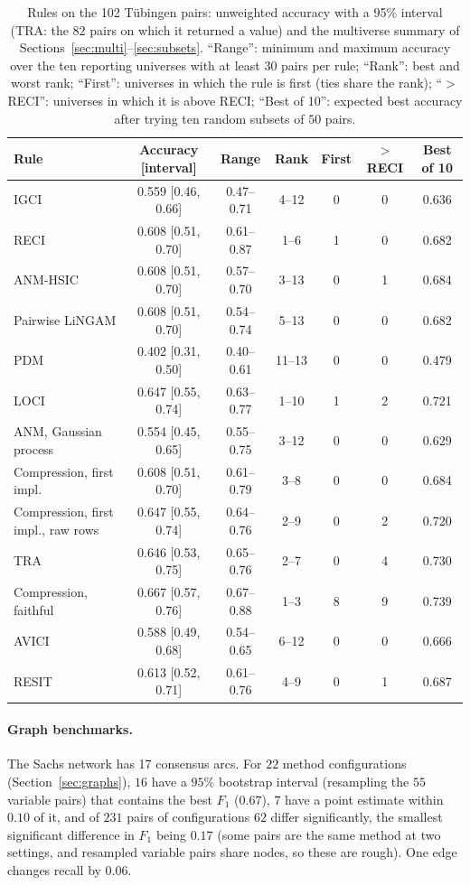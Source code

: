 \begin{table}[t]
\caption{Rules on the 102 T\"ubingen pairs: unweighted accuracy with a 95\% interval (TRA: the $82$ pairs on which it returned a value) and the multiverse summary of Sections~\ref{sec:multi}--\ref{sec:subsets}. ``Range'': minimum and maximum accuracy over the ten reporting universes with at least $30$ pairs per rule; ``Rank'': best and worst rank; ``First'': universes in which the rule is first (ties share the rank); ``$>$RECI'': universes in which it is above RECI; ``Best of 10'': expected best accuracy after trying ten random subsets of $50$ pairs.}
\label{tab:multi}
\small
\setlength{\tabcolsep}{3pt}
\begin{tabular}{@{}lcccccc@{}}
\toprule
Rule & Accuracy [interval] & Range & Rank & First & $>$RECI & Best of 10\\
\midrule
IGCI & 0.559 [0.46, 0.66] & 0.47--0.71 & 4--12 & 0 & 0 & 0.636\\
RECI & 0.608 [0.51, 0.70] & 0.61--0.87 & 1--6 & 1 & 0 & 0.682\\
ANM-HSIC & 0.608 [0.51, 0.70] & 0.57--0.70 & 3--13 & 0 & 1 & 0.684\\
Pairwise LiNGAM & 0.608 [0.51, 0.70] & 0.54--0.74 & 5--13 & 0 & 0 & 0.682\\
PDM & 0.402 [0.31, 0.50] & 0.40--0.61 & 11--13 & 0 & 0 & 0.479\\
LOCI & 0.647 [0.55, 0.74] & 0.63--0.77 & 1--10 & 1 & 2 & 0.721\\
ANM, Gaussian process & 0.554 [0.45, 0.65] & 0.55--0.75 & 3--12 & 0 & 0 & 0.629\\
Compression, first impl. & 0.608 [0.51, 0.70] & 0.61--0.79 & 3--8 & 0 & 0 & 0.684\\
Compression, first impl., raw rows & 0.647 [0.55, 0.74] & 0.64--0.76 & 2--9 & 0 & 2 & 0.720\\
TRA & 0.646 [0.53, 0.75] & 0.65--0.76 & 2--7 & 0 & 4 & 0.730\\
Compression, faithful & 0.667 [0.57, 0.76] & 0.67--0.88 & 1--3 & 8 & 9 & 0.739\\
AVICI & 0.588 [0.49, 0.68] & 0.54--0.65 & 6--12 & 0 & 0 & 0.666\\
RESIT & 0.613 [0.52, 0.71] & 0.61--0.76 & 4--9 & 0 & 1 & 0.687\\
\bottomrule
\end{tabular}
\end{table}

\paragraph{Graph benchmarks.} The Sachs network has 17 consensus arcs. For $22$ method configurations (Section~\ref{sec:graphs}), $16$ have a $95\%$ bootstrap interval (resampling the $55$ variable pairs) that contains the best $F_1$ ($0.67$), $7$ have a point estimate within $0.10$ of it, and of $231$ pairs of configurations $62$ differ significantly, the smallest significant difference in $F_1$ being $0.17$ (some pairs are the same method at two settings, and resampled variable pairs share nodes, so these are rough). One edge changes recall by $0.06$.
